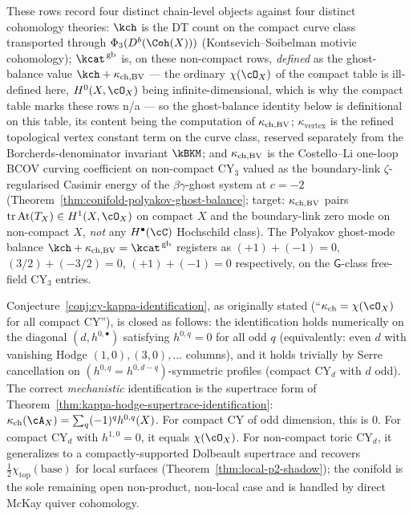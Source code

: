 \noindent These rows record four distinct chain-level objects against
four distinct cohomology theories: $\kch$ is the DT count on
the compact curve class transported through
$\Phi_3(D^b(\Coh(X)))$ (Kontsevich--Soibelman motivic cohomology);
$\kcat^{\,\mathrm{gb}}$ is, on these non-compact rows, \emph{defined}
as the ghost-balance value $\kch + \kchBV$ --- the ordinary
$\chi(\cO_X)$ of the compact table is ill-defined here, $H^0(X, \cO_X)$
being infinite-dimensional, which is why the compact table marks these
rows n/a --- so the ghost-balance identity below is definitional on
this table, its content being the computation of $\kappa_{\mathrm{ch,BV}}$;
$\kappa_{\mathrm{vertex}}$ is the refined topological
vertex constant term on the curve class, reserved separately from the
Borcherds-denominator invariant \(\kBKM\); and
$\kappa_{\mathrm{ch,BV}}$ is the Costello--Li one-loop BCOV curving coefficient
on non-compact CY$_3$ valued as the boundary-link
$\zeta$-regularised Casimir energy of the $\beta\gamma$-ghost
system at $c = -2$
(Theorem~\ref{thm:conifold-polyakov-ghost-balance}; target: $\kappa_{\mathrm{ch,BV}}$
pairs $\mathrm{tr}\,\mathrm{At}(T_X) \in H^1(X, \cO_X)$ on
compact $X$ and the boundary-link zero mode on non-compact $X$,
\emph{not} any $H^\bullet(\cC)$ Hochschild class).
The Polyakov ghost-mode balance $\kch + \kchBV = \kcat^{\,\mathrm{gb}}$
registers as
$(+1) + (-1) = 0$, $(3/2) + (-3/2) = 0$, $(+1) + (-1) = 0$ respectively,
on the $\mathsf G$-class free-field CY$_3$ entries.

Conjecture~\ref{conj:cy-kappa-identification}, as originally stated
(``$\kappa_{\mathrm{ch}} = \chi(\cO_X)$ for all compact CY''), is closed as
follows: the identification holds numerically on the diagonal
$(d, h^{0,\bullet})$ satisfying $h^{0,q} = 0$ for all odd $q$
(equivalently: even $d$ with vanishing Hodge $(1,0), (3,0), \ldots$
columns), and it holds trivially by Serre cancellation on
$(h^{0,q} = h^{0,d-q})$-symmetric profiles (compact CY$_d$ with $d$
odd). The correct \emph{mechanistic} identification is the
supertrace form of
Theorem~\ref{thm:kappa-hodge-supertrace-identification}: $\kappa_{\mathrm{ch}}
(\cA_X) = \sum_q (-1)^q h^{0,q}(X)$. For compact CY of odd dimension,
this is $0$. For compact CY$_d$ with $h^{1,0} = 0$, it equals
$\chi(\cO_X)$. For non-compact toric CY$_d$, it generalizes to a
compactly-supported Dolbeault supertrace and recovers
$\frac{1}{2} \chi_{\mathrm{top}}(\mathrm{base})$ for local surfaces
(Theorem~\ref{thm:local-p2-shadow}); the conifold is the sole
remaining open non-product, non-local case and is handled by direct
McKay quiver cohomology.

